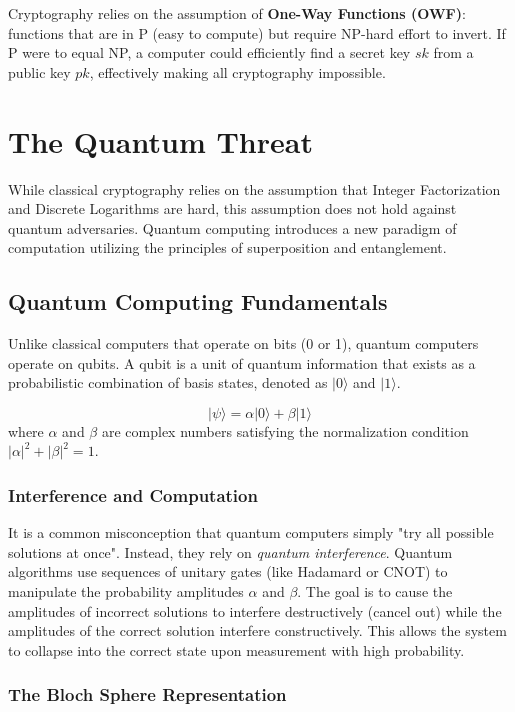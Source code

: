 Cryptography relies on the assumption of \textbf{One-Way Functions (OWF)}: functions that are in P (easy to compute) but require NP-hard effort to invert.
If P were to equal NP, a computer could efficiently find a secret key $sk$ from a public key $pk$, effectively making all cryptography impossible.
\section{The Quantum Threat}
\label{sec:quantum_threat}

While classical cryptography relies on the assumption that Integer Factorization and Discrete Logarithms are hard, this assumption does not hold against quantum adversaries.
Quantum computing introduces a new paradigm of computation utilizing the principles of superposition and entanglement.

\subsection{Quantum Computing Fundamentals}
\label{subsec:quantum_computing_basics}

Unlike classical computers that operate on bits (0 or 1), quantum computers operate on qubits.
A qubit is a unit of quantum information that exists as a probabilistic combination of basis states, denoted as $|0\rangle$ and $|1\rangle$.

\begin{equation}
    |\psi\rangle = \alpha|0\rangle + \beta|1\rangle
\end{equation}
where $\alpha$ and $\beta$ are complex numbers satisfying the normalization condition $|\alpha|^2 + |\beta|^2 = 1$.

\subsubsection{Interference and Computation}
It is a common misconception that quantum computers simply "try all possible solutions at once".
Instead, they rely on \textit{quantum interference}.
Quantum algorithms use sequences of unitary gates (like Hadamard or CNOT) to manipulate the probability amplitudes $\alpha$ and $\beta$.
The goal is to cause the amplitudes of incorrect solutions to interfere destructively (cancel out) while the amplitudes of the correct solution interfere constructively.
This allows the system to collapse into the correct state upon measurement with high probability.

\subsubsection{The Bloch Sphere Representation}

